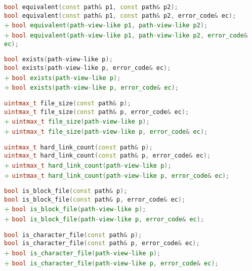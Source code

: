 \documentclass[11pt]{article}
\newcommand{\code}[2][cpp]{\lstinline[language=#1,basicstyle=\small\ttfamily]{#2}}
\newcommand{\tsreplace}[3]{\textcolor{red}{\sout{#1}}#2\textcolor{darkgreen}{#3}}
\begin{document}
\tsreplace{}{  \code{bool equivalent(const path& p1, const path& p2);}}{}\\
\tsreplace{}{  \code{bool equivalent(const path& p1, const path& p2, error_code& ec);}}{}\\
\tsreplace{}{}{+ \code{bool equivalent(path-view-like p1, path-view-like p2);}}\\
\tsreplace{}{}{+ \code{bool equivalent(path-view-like p1, path-view-like p2, error_code& ec);}}

\tsreplace{}{  \code{bool exists(path-view-like p);}}{}\\
\tsreplace{}{  \code{bool exists(path-view-like p, error_code& ec);}}{}\\
\tsreplace{}{}{+ \code{bool exists(path-view-like p);}}\\
\tsreplace{}{}{+ \code{bool exists(path-view-like p, error_code& ec);}}

\tsreplace{}{  \code{uintmax_t file_size(const path& p);}}{}\\
\tsreplace{}{  \code{uintmax_t file_size(const path& p, error_code& ec);}}{}\\
\tsreplace{}{}{+ \code{uintmax_t file_size(path-view-like p);}}\\
\tsreplace{}{}{+ \code{uintmax_t file_size(path-view-like p, error_code& ec);}}

\tsreplace{}{  \code{uintmax_t hard_link_count(const path& p);}}{}\\
\tsreplace{}{  \code{uintmax_t hard_link_count(const path& p, error_code& ec);}}{}\\
\tsreplace{}{}{+ \code{uintmax_t hard_link_count(path-view-like p);}}\\
\tsreplace{}{}{+ \code{uintmax_t hard_link_count(path-view-like p, error_code& ec);}}

\tsreplace{}{  \code{bool is_block_file(const path& p);}}{}\\
\tsreplace{}{  \code{bool is_block_file(const path& p, error_code& ec);}}{}\\
\tsreplace{}{}{+ \code{bool is_block_file(path-view-like p);}}\\
\tsreplace{}{}{+ \code{bool is_block_file(path-view-like p, error_code& ec);}}

\tsreplace{}{  \code{bool is_character_file(const path& p);}}{}\\
\tsreplace{}{  \code{bool is_character_file(const path& p, error_code& ec);}}{}\\
\tsreplace{}{}{+ \code{bool is_character_file(path-view-like p);}}\\
\tsreplace{}{}{+ \code{bool is_character_file(path-view-like p, error_code& ec);}}
\end{document}

